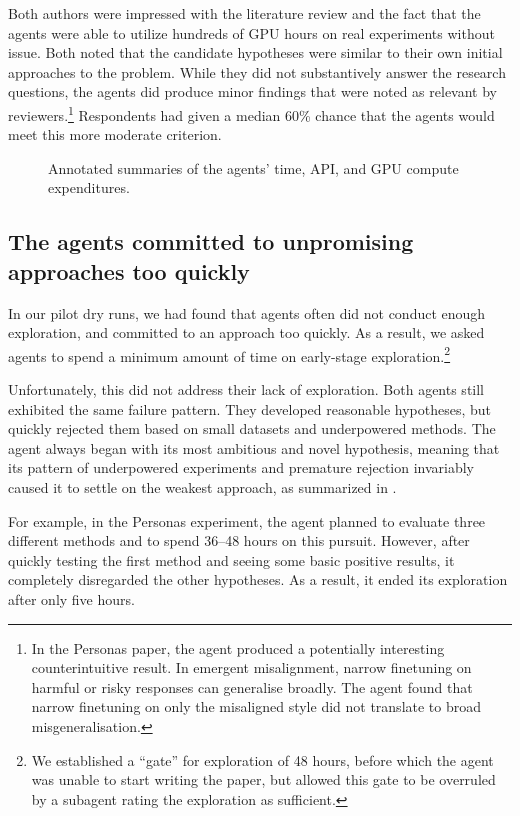 Both authors were impressed with the literature review and the fact that the
agents were able to utilize hundreds of GPU hours on real experiments without
issue. Both noted that the candidate hypotheses were similar to their own
initial approaches to the problem. While they did not substantively answer the
research questions, the agents did produce minor findings that were noted as
relevant by reviewers.\footnote{In the Personas paper, the agent produced a potentially interesting counterintuitive result. In emergent misalignment, narrow finetuning on harmful or risky responses can generalise broadly. The agent found that narrow finetuning on only the misaligned style did not translate to broad misgeneralisation.} Respondents had given a median 60\% chance that the agents
would meet this more moderate criterion.

\begin{figure}[p]
  \centering
  
  \caption{Annotated summaries of the agents' time, API, and GPU compute
  expenditures.}
  \label{fig:resource-use}
\end{figure}


\subsection{The agents committed to unpromising approaches too quickly}

In our pilot dry runs, we had found that agents often did not conduct enough
exploration, and committed to an approach too quickly. As a result, we asked
agents to spend a minimum amount of time on early-stage
exploration.\footnote{We established a ``gate'' for exploration of 48 hours,
before which the agent was unable to start writing the paper, but allowed this
gate to be overruled by a subagent rating the exploration as sufficient.}

Unfortunately, this did not address their lack of exploration. Both agents still
exhibited the same failure pattern. They developed reasonable
hypotheses, but quickly rejected them based on small datasets and underpowered
methods. The agent always began with its most ambitious and novel hypothesis,
meaning that its pattern of underpowered experiments and premature rejection
invariably caused it to settle on the weakest approach, as summarized in
.

For example, in the Personas experiment, the agent planned to evaluate
three different methods and to spend 36--48 hours on this pursuit. However,
after quickly testing the first method and seeing some basic positive results,
it completely disregarded the other hypotheses. As a result, it ended its
exploration after only five hours.

